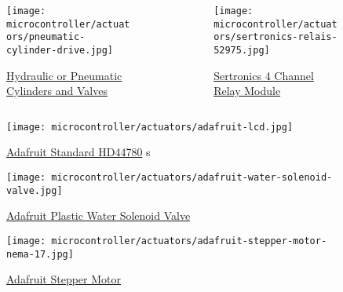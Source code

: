 \begin{frame}
    \begin{columns}[t]
        \begin{column}{0.5\textwidth}
            \begin{figure}
                \texttt{[image: microcontroller/actuators/pneumatic-cylinder-drive.jpg]}
                \caption{\href{https://hpcontrol.eu/silownik-pneumatyczny-naped-32x200-sc.html}{Hydraulic or Pneumatic Cylinders and Valves}}
            \end{figure}
        \end{column}
        \begin{column}{0.5\textwidth}
            \begin{figure}
                \texttt{[image: microcontroller/actuators/sertronics-relais-52975.jpg]}
                \caption{\href{https://b2b.sertronics-shop.de/Sensoren-/-Module/Relaiskarten/5V-4-Kanal-Relais-Modul/}{Sertronics 4 Channel Relay Module}}
            \end{figure}
        \end{column}
    \end{columns}
    \begin{figure}
        \texttt{[image: microcontroller/actuators/adafruit-lcd.jpg]}
        \caption{\href{https://www.adafruit.com/product/181}{Adafruit Standard HD44780} s}
    \end{figure}
\end{frame}

\begin{frame}
    \begin{figure}
        \texttt{[image: microcontroller/actuators/adafruit-water-solenoid-valve.jpg]}
        \caption{\href{https://www.adafruit.com/product/997}{Adafruit Plastic Water Solenoid Valve}}
    \end{figure}
    \begin{figure}
        \texttt{[image: microcontroller/actuators/adafruit-stepper-motor-nema-17.jpg]}
        \caption{\href{https://www.adafruit.com/product/324}{Adafruit Stepper Motor}}
    \end{figure}
\end{frame}